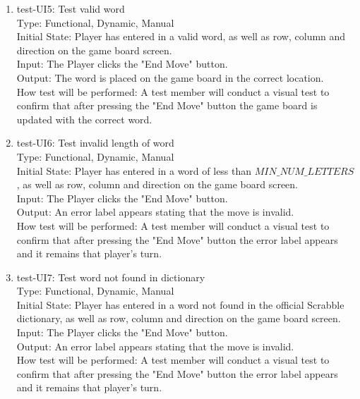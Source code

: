 \documentclass[12pt, titlepage]{article}
\begin{document}
\begin{enumerate}
    \item{test-UI5: Test valid word\\} %
    Type: Functional, Dynamic, Manual\\
    Initial State: Player has entered in a valid word, as well as row, column and direction on the game board screen.\\
    Input: The Player clicks the "End Move" button.\\
    Output: The word is placed on the game board in the correct location.\\
    How test will be performed: A test member will conduct a visual test to confirm that after pressing the "End Move" button the game board is updated with the correct word.\\ 
    
    \item{test-UI6: Test invalid length of word \\} %
    Type: Functional, Dynamic, Manual\\
    Initial State: Player has entered in a word of less than $MIN\_NUM\_LETTERS$, as well as row, column and direction on the game board screen.\\
    Input: The Player clicks the "End Move" button.\\
    Output: An error label appears stating that the move is invalid.\\
    How test will be performed: A test member will conduct a visual test to confirm that after pressing the "End Move" button the error label appears and it remains that player's turn.\\
    
    \item{test-UI7: Test word not found in dictionary\\} %
    Type: Functional, Dynamic, Manual\\
    Initial State: Player has entered in a word not found in the official Scrabble dictionary, as well as row, column and direction on the game board screen.\\
    Input: The Player clicks the "End Move" button.\\
    Output: An error label appears stating that the move is invalid.\\
    How test will be performed: A test member will conduct a visual test to confirm that after pressing the "End Move" button the error label appears and it remains that player's turn.\\
    

\end{enumerate}
\end{document}

